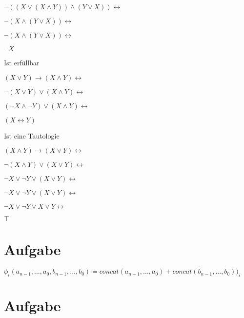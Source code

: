 \documentclass[11pt]{amsart}
\begin{document}
$
\lnot ((X \lor (X \land Y)) \land (Y \lor X)) \leftrightarrow
$

$
\lnot (X \land (Y \lor X)) \leftrightarrow
$

$
\lnot (X \land (Y \lor X)) \leftrightarrow
$

$
\lnot X
$

Ist erfüllbar

$
(X \lor Y) \to (X \land Y) \leftrightarrow
$

$
\lnot(X \lor Y) \lor (X \land Y) \leftrightarrow
$

$
(\lnot X \land \lnot Y) \lor (X \land Y) \leftrightarrow
$

$
(X \leftrightarrow Y)
$

Ist eine Tautologie

$
(X \land Y ) \to (X \lor Y) \leftrightarrow
$

$
\lnot (X \land Y ) \lor (X \lor Y) \leftrightarrow
$

$
\lnot X \lor \lnot Y \lor (X \lor Y) \leftrightarrow
$

$
\lnot X \lor \lnot Y \lor (X \lor Y) \leftrightarrow
$

$
\lnot X \lor \lnot Y \lor X \lor Y \leftrightarrow
$

$
\top
$

\section{Aufgabe}

$
\phi_i(a_{n-1},...,a_0,b_{n-1},...,b_0) = concat(a_{n-1},...,a_0) + concat(b_{n-1},...,b_0))_i
$

\section{Aufgabe}
\end{document}
